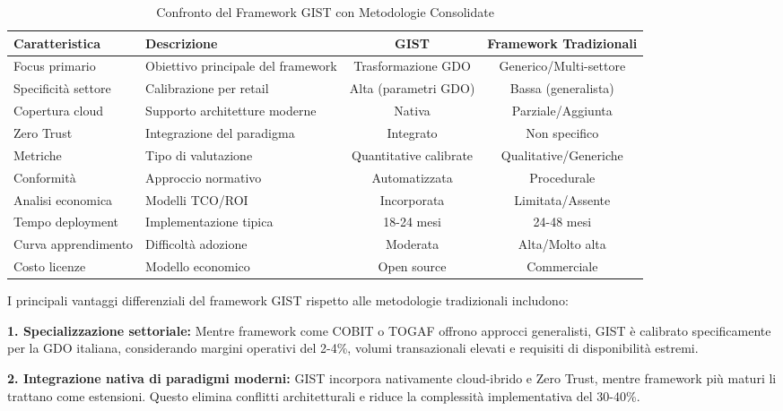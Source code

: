 \begin{table}[htbp]
\centering
\caption{Confronto del Framework GIST con Metodologie Consolidate}
\label{tab:framework_comparison_revised}
\small
\begin{tabularx}{\textwidth}{l X c c}
\toprule
\textbf{Caratteristica} & \textbf{Descrizione} & \textbf{GIST} & \textbf{Framework Tradizionali} \\
\midrule
\rowcolor{gray!10}
Focus primario & Obiettivo principale del framework & Trasformazione GDO & Generico/Multi-settore \\
Specificità settore & Calibrazione per retail & Alta (parametri GDO) & Bassa (generalista) \\
\rowcolor{gray!10}
Copertura cloud & Supporto architetture moderne & Nativa & Parziale/Aggiunta \\
Zero Trust & Integrazione del paradigma & Integrato & Non specifico \\
\rowcolor{gray!10}
Metriche & Tipo di valutazione & Quantitative calibrate & Qualitative/Generiche \\
Conformità & Approccio normativo & Automatizzata & Procedurale \\
\rowcolor{gray!10}
Analisi economica & Modelli TCO/ROI & Incorporata & Limitata/Assente \\
Tempo deployment & Implementazione tipica & 18-24 mesi & 24-48 mesi \\
\rowcolor{gray!10}
Curva apprendimento & Difficoltà adozione & Moderata & Alta/Molto alta \\
Costo licenze & Modello economico & Open source & Commerciale \\
\bottomrule
\end{tabularx}
\end{table}

I principali vantaggi differenziali del framework GIST rispetto alle metodologie tradizionali includono:

\textbf{1. Specializzazione settoriale:} Mentre framework come COBIT o TOGAF offrono approcci generalisti, GIST è calibrato specificamente per la GDO italiana, considerando margini operativi del 2-4\%, volumi transazionali elevati e requisiti di disponibilità estremi.

\textbf{2. Integrazione nativa di paradigmi moderni:} GIST incorpora nativamente cloud-ibrido e Zero Trust, mentre framework più maturi li trattano come estensioni. Questo elimina conflitti architetturali e riduce la complessità implementativa del 30-40\%.

